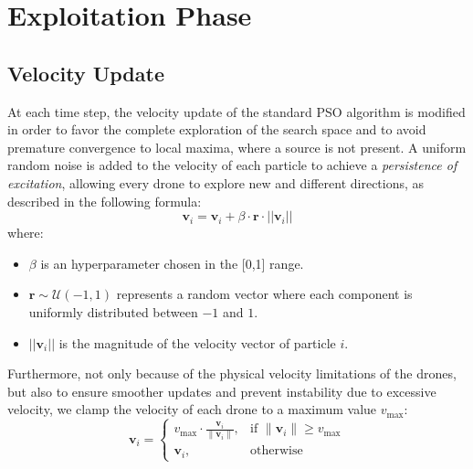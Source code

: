 \section{Exploitation Phase}
\subsection{Velocity Update}
At each time step, the velocity update of the standard PSO algorithm is modified in order to favor the complete 
exploration of the search space and to avoid premature convergence to local maxima, where a source is not present. 
A uniform random noise is added to the velocity of each particle to achieve a \textit{persistence of excitation},
allowing every drone to explore new and different directions, 
as described in the following formula:
\[
\mathbf{v}_i = \mathbf{v}_i + \beta \cdot \mathbf{r} \cdot ||\mathbf{v}_i||
\] \label{eq:persistence_of_excitation}
where:
\begin{itemize}
    \item \(\beta\) is an hyperparameter chosen in the [0,1] range.
    \item \(\mathbf{r} \sim \mathcal{U}(-1, 1)\) represents a random vector where each component is uniformly distributed between \(-1\) and \(1\).
    \item \(||\mathbf{v}_i||\) is the magnitude of the velocity vector of particle \(i\).
\end{itemize}
Furthermore, not only because of the physical velocity limitations of the drones, but also to ensure smoother updates 
and prevent instability due to excessive velocity, we clamp the velocity of each drone 
to a maximum value \(v_{\text{max}}\):
\[
\mathbf{v}_i = 
\begin{cases} 
v_{\text{max}} \cdot \frac{\mathbf{v}_i}{\|\mathbf{v}_i\|}, & \text{if } \|\mathbf{v}_i\| \geq v_{\text{max}} \\
\mathbf{v}_i, & \text{otherwise}
\end{cases}
\] \label{eq:velocity_clamping}


